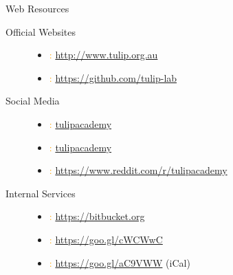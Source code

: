 \begin{slide}{Web Resources}
\begin{description}
\item[Official Websites]
  \begin{itemize}
    \item \textcolor{orange}{\faHome:} \url{http://www.tulip.org.au}
    \item \textcolor{orange}{\faGithub:} \url{https://github.com/tulip-lab}
  \end{itemize}

\item[Social Media]
  \begin{itemize}
    \item \textcolor{orange}{\faTwitter:} \href{https://twitter.com/tulipacademy}{tulipacademy}
    \item \textcolor{orange}{\faWeibo:} \href{https://weibo.com/tulipacademy}{tulipacademy}
    \item \textcolor{orange}{\faRedditAlien:} \url{https://www.reddit.com/r/tulipacademy}
  \end{itemize}

\item[Internal Services]
  \begin{itemize}
   \item \textcolor{orange}{\faBitbucket:} \url{https://bitbucket.org}
   \item \textcolor{orange}{\faCalendar:} \url{https://goo.gl/cWCWwC}
   \item \textcolor{orange}{\faCalendarCheckO:} \url{https://goo.gl/aC9VWW} (iCal)
  \end{itemize}

\end{description}
\end{slide}
